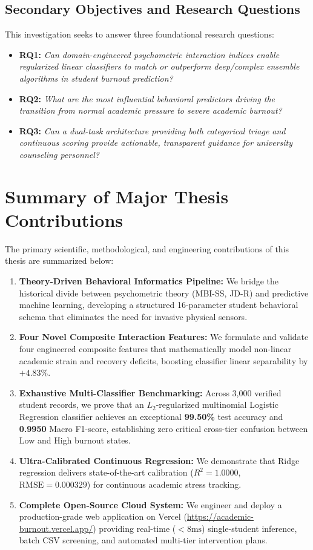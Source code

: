\documentclass[12pt,a4paper,oneside]{report}
\begin{document}
\subsection{Secondary Objectives and Research Questions}
This investigation seeks to answer three foundational research questions:
\begin{itemize}
    \item \textbf{RQ1:} \emph{Can domain-engineered psychometric interaction indices enable regularized linear classifiers to match or outperform deep/complex ensemble algorithms in student burnout prediction?}
    \item \textbf{RQ2:} \emph{What are the most influential behavioral predictors driving the transition from normal academic pressure to severe academic burnout?}
    \item \textbf{RQ3:} \emph{Can a dual-task architecture providing both categorical triage and continuous scoring provide actionable, transparent guidance for university counseling personnel?}

\end{itemize}

\section{Summary of Major Thesis Contributions}
\label{sec:contributions}
The primary scientific, methodological, and engineering contributions of this thesis are summarized below:
\begin{enumerate}
    \item \textbf{Theory-Driven Behavioral Informatics Pipeline:} We bridge the historical divide between psychometric theory (MBI-SS, JD-R) and predictive machine learning, developing a structured 16-parameter student behavioral schema that eliminates the need for invasive physical sensors.
    \item \textbf{Four Novel Composite Interaction Features:} We formulate and validate four engineered composite features that mathematically model non-linear academic strain and recovery deficits, boosting classifier linear separability by $+4.83\%$.
    \item \textbf{Exhaustive Multi-Classifier Benchmarking:} Across 3,000 verified student records, we prove that an $L_2$-regularized multinomial Logistic Regression classifier achieves an exceptional \textbf{99.50\%} test accuracy and \textbf{0.9950} Macro F1-score, establishing zero critical cross-tier confusion between Low and High burnout states.
    \item \textbf{Ultra-Calibrated Continuous Regression:} We demonstrate that Ridge regression delivers state-of-the-art calibration ($R^2 = 1.0000$, $\text{RMSE} = 0.000329$) for continuous academic stress tracking.
    \item \textbf{Complete Open-Source Cloud System:} We engineer and deploy a production-grade web application on Vercel (\url{https://academic-burnout.vercel.app/}) providing real-time ($<8\text{ms}$) single-student inference, batch CSV screening, and automated multi-tier intervention plans.
\end{enumerate}
\end{document}
